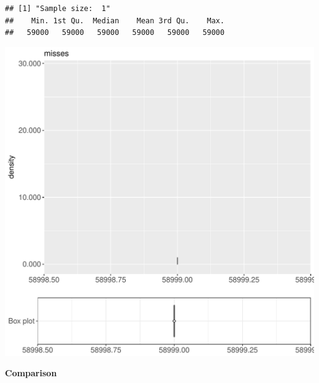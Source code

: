 \documentclass{article}\usepackage[]{graphicx}\usepackage[]{color}
\makeatletter
\def\maxwidth{ %
  \ifdim\Gin@nat@width>\linewidth
    \linewidth
  \else
    \Gin@nat@width
  \fi
}
\newenvironment{kframe}{%
 \def\at@end@of@kframe{}%
 \ifinner\ifhmode%
  \def\at@end@of@kframe{\end{minipage}}%
  \begin{minipage}{\columnwidth}%
 \fi\fi%
 \def\FrameCommand##1{\hskip\@totalleftmargin \hskip-\fboxsep
 \colorbox{shadecolor}{##1}\hskip-\fboxsep
     \hskip-\linewidth \hskip-\@totalleftmargin \hskip\columnwidth}%
 \MakeFramed {\advance\hsize-\width
   \@totalleftmargin\z@ \linewidth\hsize
   \@setminipage}}%
 {\par\unskip\endMakeFramed%
 \at@end@of@kframe}
\newenvironment{knitrout}{}{} %
\makeatother
\begin{document}
\begin{knitrout}
\color{fgcolor}\begin{kframe}
\begin{verbatim}
## [1] "Sample size:  1"
##    Min. 1st Qu.  Median    Mean 3rd Qu.    Max. 
##   59000   59000   59000   59000   59000   59000
\end{verbatim}


{\ttfamily\noindent\bfseries{}}\end{kframe}
\includegraphics[width=\maxwidth]{figure/RH4_trivialcaching_obscure-1} 

\end{knitrout}
  
 \textbf{Comparison}
  
\end{document}
